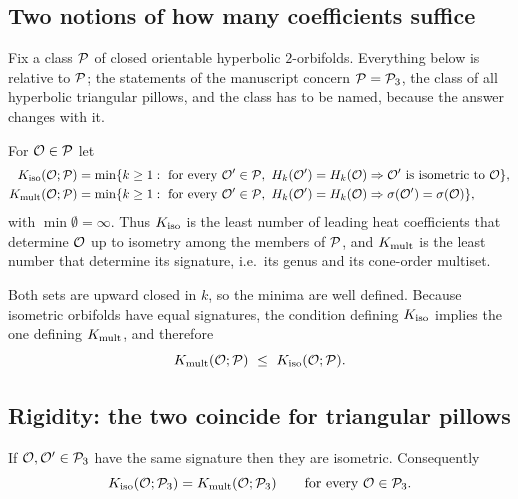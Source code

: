 \subsection{Two notions of how many coefficients suffice}

Fix a class $\mathcal{P}$ of closed orientable hyperbolic $2$-orbifolds. Everything below is relative
to $\mathcal{P}$; the statements of the manuscript concern $\mathcal{P}=\mathcal{P}_3$, the class of all hyperbolic
triangular pillows, and the class has to be named, because the answer changes with it.

\begin{definition}\label{def:K}
For $\mathcal{O}\in\mathcal{P}$ let
\begin{align*}
  \Kiso(\Orb;\Pill)&=\min\{k\ge1:\ \text{for every }\Orb'\in\Pill,\ H_k(\Orb')=H_k(\Orb)\Rightarrow\Orb'\ \text{is isometric to }\Orb\},\\
  \Kmult(\Orb;\Pill)&=\min\{k\ge1:\ \text{for every }\Orb'\in\Pill,\ H_k(\Orb')=H_k(\Orb)\Rightarrow\sigma(\Orb')=\sigma(\Orb)\},
\end{align*}
with $\min\emptyset=\infty$. Thus $K_{\mathrm{iso}}$ is the least number of leading heat coefficients that
determine $\mathcal{O}$ up to isometry among the members of $\mathcal{P}$, and $K_{\mathrm{mult}}$ is the least number that
determine its signature, i.e.\ its genus and its cone-order multiset.
\end{definition}

Both sets are upward closed in $k$, so the minima are well defined. Because isometric orbifolds
have equal signatures, the condition defining $K_{\mathrm{iso}}$ implies the one defining $K_{\mathrm{mult}}$, and
therefore
\begin{equation}\label{eq:Kcompare}
  K_{\mathrm{mult}}(\mathcal{O};\mathcal{P})\ \le\ K_{\mathrm{iso}}(\mathcal{O};\mathcal{P}).
\end{equation}

\subsection{Rigidity: the two coincide for triangular pillows}

\begin{proposition}\label{prop:rigidity}
If $\mathcal{O},\mathcal{O}'\in\mathcal{P}_3$ have the same signature then they are isometric. Consequently
\[
  K_{\mathrm{iso}}(\mathcal{O};\mathcal{P}_3)=K_{\mathrm{mult}}(\mathcal{O};\mathcal{P}_3)\qquad\text{for every }\mathcal{O}\in\mathcal{P}_3 .
\]
\end{proposition}

